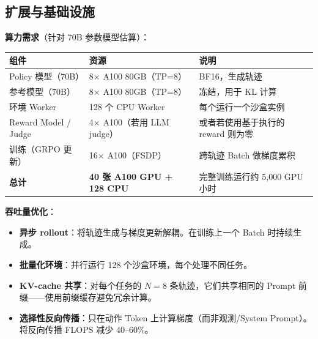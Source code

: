 \subsection{扩展与基础设施}
\label{scaling-and-infrastructure}

\textbf{算力需求}（针对 70B 参数模型估算）：

\noindent\begin{tabularx}{\linewidth}{@{}Z{0.8} Z{0.9} Z{1.3}@{}}
\toprule
\textbf{组件} & \textbf{资源} & \textbf{说明} \\
\midrule
Policy 模型（70B） & 8$\times$ A100 80GB（TP=8） & BF16，生成轨迹 \\
参考模型（70B） & 8$\times$ A100 80GB（TP=8） & 冻结，用于 KL 计算 \\
环境 Worker & 128 个 CPU Worker & 每个运行一个沙盒实例 \\
Reward Model / Judge & 4$\times$ A100（若用 LLM judge） & 或者若使用基于执行的 reward 则为零 \\
训练（GRPO 更新） & 16$\times$ A100（FSDP） & 跨轨迹 Batch 做梯度累积 \\
\textbf{总计} & \textbf{40 张 A100 GPU + 128 CPU} & 完整训练运行约 5,000 GPU 小时 \\
\bottomrule
\end{tabularx}

\textbf{吞吐量优化}：

\begin{itemize}
  \item \textbf{异步 rollout}：将轨迹生成与梯度更新解耦。在训练上一个 Batch 时持续生成。
  \item \textbf{批量化环境}：并行运行 128 个沙盒环境，每个处理不同任务。
  \item \textbf{KV-cache 共享}：对每个任务的 $N=8$ 条轨迹，它们共享相同的 Prompt 前缀——使用前缀缓存避免冗余计算。
  \item \textbf{选择性反向传播}：只在动作 Token 上计算梯度（而非观测/System Prompt）。将反向传播 FLOPS 减少 40--60\%。
\end{itemize}

